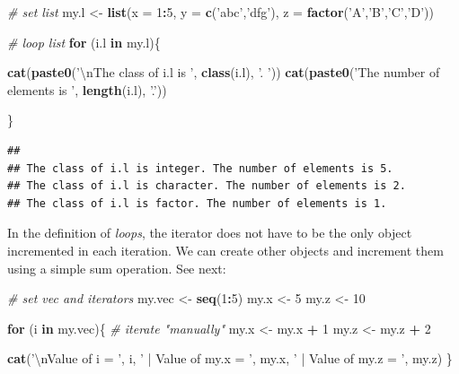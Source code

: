\documentclass[11pt,]{book}
\newenvironment{Shaded}{\begin{snugshade}}{\end{snugshade}}
\newcommand{\KeywordTok}[1]{\textcolor[rgb]{0.27,0.27,0.27}{\textbf{#1}}}
\newcommand{\DataTypeTok}[1]{\textcolor[rgb]{0.27,0.27,0.27}{#1}}
\newcommand{\DecValTok}[1]{\textcolor[rgb]{0.06,0.06,0.06}{#1}}
\newcommand{\CharTok}[1]{\textcolor[rgb]{0.5,0.5,0.5}{#1}}
\newcommand{\StringTok}[1]{\textcolor[rgb]{0.5,0.5,0.5}{#1}}
\newcommand{\CommentTok}[1]{\textcolor[rgb]{0.56,0.35,0.01}{\textit{#1}}}
\newcommand{\ControlFlowTok}[1]{\textcolor[rgb]{0.13,0.29,0.53}{\textbf{#1}}}
\newcommand{\OperatorTok}[1]{\textcolor[rgb]{0.81,0.36,0.00}{\textbf{#1}}}
\newcommand{\NormalTok}[1]{#1}
\begin{document}
\begin{Shaded}
\begin{Highlighting}[]
\CommentTok{# set list}
\NormalTok{my.l <-}\StringTok{ }\KeywordTok{list}\NormalTok{(}\DataTypeTok{x =} \DecValTok{1}\OperatorTok{:}\DecValTok{5}\NormalTok{, }
             \DataTypeTok{y =} \KeywordTok{c}\NormalTok{(}\StringTok{'abc'}\NormalTok{,}\StringTok{'dfg'}\NormalTok{), }
             \DataTypeTok{z =} \KeywordTok{factor}\NormalTok{(}\StringTok{'A'}\NormalTok{,}\StringTok{'B'}\NormalTok{,}\StringTok{'C'}\NormalTok{,}\StringTok{'D'}\NormalTok{))}

\CommentTok{# loop list}
\ControlFlowTok{for}\NormalTok{ (i.l }\ControlFlowTok{in}\NormalTok{ my.l)\{}
  
  \KeywordTok{cat}\NormalTok{(}\KeywordTok{paste0}\NormalTok{(}\StringTok{'}\CharTok{\textbackslash{}n}\StringTok{The class of i.l is '}\NormalTok{, }\KeywordTok{class}\NormalTok{(i.l), }\StringTok{'. '}\NormalTok{))}
  \KeywordTok{cat}\NormalTok{(}\KeywordTok{paste0}\NormalTok{(}\StringTok{'The number of elements is '}\NormalTok{, }\KeywordTok{length}\NormalTok{(i.l), }\StringTok{'.'}\NormalTok{))}
  
\NormalTok{\}}
\end{Highlighting}
\end{Shaded}

\begin{verbatim}
## 
## The class of i.l is integer. The number of elements is 5.
## The class of i.l is character. The number of elements is 2.
## The class of i.l is factor. The number of elements is 1.
\end{verbatim}

In the definition of \emph{loops}, the iterator does not have to be the
only object incremented in each iteration. We can create other objects
and increment them using a simple sum operation. See next:

\begin{Shaded}
\begin{Highlighting}[]
\CommentTok{# set vec and iterators}
\NormalTok{my.vec <-}\StringTok{ }\KeywordTok{seq}\NormalTok{(}\DecValTok{1}\OperatorTok{:}\DecValTok{5}\NormalTok{)}
\NormalTok{my.x <-}\StringTok{ }\DecValTok{5}
\NormalTok{my.z <-}\StringTok{ }\DecValTok{10}

\ControlFlowTok{for}\NormalTok{ (i }\ControlFlowTok{in}\NormalTok{ my.vec)\{}
  \CommentTok{# iterate "manually"}
\NormalTok{  my.x <-}\StringTok{ }\NormalTok{my.x }\OperatorTok{+}\StringTok{ }\DecValTok{1}
\NormalTok{  my.z <-}\StringTok{ }\NormalTok{my.z }\OperatorTok{+}\StringTok{ }\DecValTok{2}
  
  \KeywordTok{cat}\NormalTok{(}\StringTok{'}\CharTok{\textbackslash{}n}\StringTok{Value of i = '}\NormalTok{, i, }
      \StringTok{' | Value of my.x = '}\NormalTok{, my.x, }
      \StringTok{' | Value of my.z = '}\NormalTok{, my.z)}
\NormalTok{\}}
\end{Highlighting}
\end{Shaded}
\end{document}

